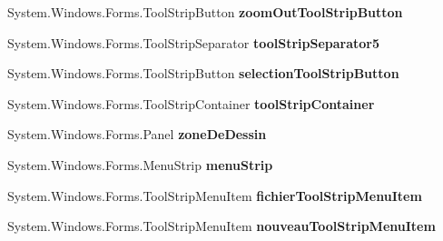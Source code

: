 \begin{DoxyCompactItemize}
\item 
System.\+Windows.\+Forms.\+Tool\+Strip\+Button {\bfseries zoom\+Out\+Tool\+Strip\+Button}\hypertarget{class_interface_graphique_1_1_edition_a2c7e988cd24fafc67367ccb667f5b7ff}{}\label{class_interface_graphique_1_1_edition_a2c7e988cd24fafc67367ccb667f5b7ff}

\item 
System.\+Windows.\+Forms.\+Tool\+Strip\+Separator {\bfseries tool\+Strip\+Separator5}\hypertarget{class_interface_graphique_1_1_edition_ae59db2fca3de88fcd25a675a6c0b131c}{}\label{class_interface_graphique_1_1_edition_ae59db2fca3de88fcd25a675a6c0b131c}

\item 
System.\+Windows.\+Forms.\+Tool\+Strip\+Button {\bfseries selection\+Tool\+Strip\+Button}\hypertarget{class_interface_graphique_1_1_edition_ac8f2e0a6f71ba716c7eb0af65b8c54af}{}\label{class_interface_graphique_1_1_edition_ac8f2e0a6f71ba716c7eb0af65b8c54af}

\item 
System.\+Windows.\+Forms.\+Tool\+Strip\+Container {\bfseries tool\+Strip\+Container}\hypertarget{class_interface_graphique_1_1_edition_abc3e20d69cd06050171b350c51142c02}{}\label{class_interface_graphique_1_1_edition_abc3e20d69cd06050171b350c51142c02}

\item 
System.\+Windows.\+Forms.\+Panel {\bfseries zone\+De\+Dessin}\hypertarget{class_interface_graphique_1_1_edition_a8174fa26717a9106b9ac36c702861d37}{}\label{class_interface_graphique_1_1_edition_a8174fa26717a9106b9ac36c702861d37}

\item 
System.\+Windows.\+Forms.\+Menu\+Strip {\bfseries menu\+Strip}\hypertarget{class_interface_graphique_1_1_edition_afefe6a1d3d92b1d934ae9ea836cf6e23}{}\label{class_interface_graphique_1_1_edition_afefe6a1d3d92b1d934ae9ea836cf6e23}

\item 
System.\+Windows.\+Forms.\+Tool\+Strip\+Menu\+Item {\bfseries fichier\+Tool\+Strip\+Menu\+Item}\hypertarget{class_interface_graphique_1_1_edition_a3213c2692b6b4f1dbf8eee2d710517a2}{}\label{class_interface_graphique_1_1_edition_a3213c2692b6b4f1dbf8eee2d710517a2}

\item 
System.\+Windows.\+Forms.\+Tool\+Strip\+Menu\+Item {\bfseries nouveau\+Tool\+Strip\+Menu\+Item}\hypertarget{class_interface_graphique_1_1_edition_a49b8d1482b974f1eb0cc9e22f04c78a5}{}\label{class_interface_graphique_1_1_edition_a49b8d1482b974f1eb0cc9e22f04c78a5}


\end{DoxyCompactItemize}
